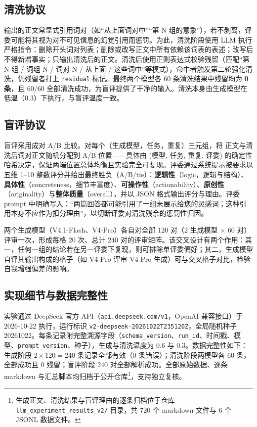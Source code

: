 \subsection{清洗协议}\label{sec:cleaning}

\wordpairs{} 输出的正文常显式引用词对（如“从上面词对中”“第 N 组的意象”），若不剥离，评委可能将其视为对不可见信息的幻觉引用而惩罚。为此，清洗阶段使用 LLM 执行严格指令：删除开头词对列表；删除或改写正文中所有依赖该词表的表述；改写后不得新增事实；只输出清洗后的正文。清洗后使用正则表达式校验残留（匹配“第 N 组 / 词组 N / 词对 N / 从上面 / 这些词中”等模式），命中者触发第二轮强化清洗，仍残留者打上 \texttt{residual} 标记。最终两个模型各 60 条清洗结果中残留均为 \textbf{0 条}，且 60/60 全部清洗成功，为盲评提供了干净的输入。清洗本身由生成模型在低温（$0.3$）下执行，与盲评温度一致。

\subsection{盲评协议}\label{sec:judge}

盲评采用成对 A/B 比较。对每个（生成模型，任务，重复）三元组，将 \baseline{} 正文与清洗后词对正文随机分配到 A/B 位置——具体由 (模型, 任务, 重复, 评委) 的确定性哈希决定，保证两端位置总体均衡且实验完全可复现。评委通过系统提示被要求以五维 1--10 整数评分并给出最终胜负（A/B/tie）：\textbf{逻辑性}（logic，逻辑与结构）、\textbf{具体性}（concreteness，细节丰富度）、\textbf{可操作性}（actionability）、\textbf{原创性}（originality）与\textbf{整体质量}（overall），并以 JSON 格式输出评分与理由。评委 prompt 中明确写入：“两篇回答都可能引用了一组未展示给您的灵感词；这种引用本身不应作为扣分理由”，以切断评委对清洗残余的惩罚性归因。

两个生成模型（V4.1-Flash、V4-Pro）各自对全部 120 对（2 生成模型 $\times$ 60 对）评审一次，形成每格 20 次、总计 240 对的评审矩阵。该交叉设计有两个作用：其一，任何一组的结论若在另一评委下复现，则可排除单评委偏好；其二，生成模型自评其输出构成的格子（如 V4-Pro 评审 V4-Pro 生成）可与交叉格子对比，检验自我增强偏差的影响。

\subsection{实现细节与数据完整性}

实验通过 DeepSeek 官方 API（\texttt{api.deepseek.com/v1}，OpenAI 兼容接口）于 2026-10-22 执行，运行标识 \texttt{v2-deepseek-20261022T235120Z}，全局随机种子 20261022。每条记录附完整溯源字段（\texttt{schema\_version}、\texttt{run\_id}、时间戳、模型、\texttt{prompt\_version}、种子），生成与清洗温度为 $0.6$ 与 $0.3$。数据完整性如下：生成阶段 $2\times120=240$ 条记录全部有效（0 条错误）；清洗阶段两模型各 60 条，全部成功且 0 残留；盲评阶段 240 对全部解析成功。全部原始数据、逐条 markdown 与汇总脚本均归档于公开仓库\footnote{生成正文、清洗结果与盲评理由的逐条归档位于仓库 \texttt{llm\_experiment\_results\_v2/} 目录，共 720 个 markdown 文件与 6 个 JSONL 数据文件。}，支持独立复核。

